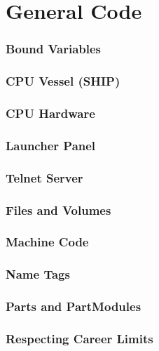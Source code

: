 \part{General Code}
	\section{Bound Variables}
	\section{CPU Vessel (SHIP)}
	\section{CPU Hardware}
	\section{Launcher Panel}
	\section{Telnet Server}
	\section{Files and Volumes}
	\section{Machine Code}
	\section{Name Tags}
	\section{Parts and PartModules}
	\section{Respecting Career Limits}
